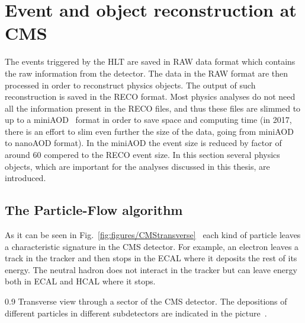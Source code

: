 \section{Event and object reconstruction at CMS~\label{sec:objects}}

The events triggered by the HLT are saved in RAW data format which contains the raw information from the detector. The data in the RAW format are then processed in order to reconstruct physics objects. The output of such reconstruction is saved in the RECO format. Most physics analyses do not need all the information present in the RECO files, and thus these files are slimmed to up to a miniAOD~\cite{Petrucciani:2029414} format in order to save space and computing time (in 2017, there is an effort to slim even further the size of the data, going from miniAOD to nanoAOD format). In the miniAOD the event size is reduced by factor of around 60 compered to the RECO event size. In this section several physics objects, which are important for the analyses discussed in this thesis, are introduced.


\subsection{The Particle-Flow algorithm}

As it can be seen in Fig.~\ref{fig:figures/CMStransverse}~\cite{Sirunyan:2017ulk} each kind of particle leaves a characteristic signature in the CMS detector. For example, an electron leaves a track in the tracker and then stops in the ECAL where it deposits the rest of its energy. The neutral hadron does not interact in the tracker but can leave energy both in ECAL and  HCAL where it stops.

                 {0.9}       %
                 { Transverse view through a sector of the CMS detector. The depositions of different particles in different subdetectors are indicated in the picture~\cite{Sirunyan:2017ulk}. }

